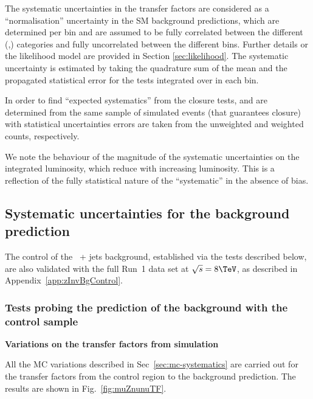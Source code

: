 The systematic uncertainties in the transfer factors are considered as
a ``normalisation'' uncertainty in the SM background predictions,
which are determined per \scalht bin and are
assumed to be fully correlated between the different (\njet,\nb)
categories and fully uncorrelated between the different \scalht bins. 
Further details or the likelihood model
are provided in Section \ref{sec:likelihood}. The systematic
uncertainty is estimated by taking the quadrature sum of the 
mean and the propagated statistical error for the tests integrated
over \njet in each \scalht bin.

In order to find ``expected systematics'' from the closure tests, \nobs and \npre are
determined from the same sample of simulated events (that guarantees
closure) with statistical uncertainties errors are taken from the
unweighted and weighted counts, respectively. 

We note the behaviour of the magnitude of the systematic uncertainties
on the integrated luminosity, which reduce with increasing
luminosity. This is a reflection of the fully statistical nature of
the ``systematic'' in the absence of bias.

\subsection{Systematic uncertainties for the \znunu background
prediction}

The control of the \znunu\ + jets background, established via the
tests described below, are also validated with the full Run~1 data set
at $\sqrt{s} = 8\tev$, as described in
Appendix~\ref{app:zInvBgControl}.

\subsubsection{Tests probing the prediction of the \znunu
background with the \mj control sample}
\label{sec:muZnunu}

{\bf Variations on the transfer factors from simulation}

All the MC variations described in Sec~\ref{sec:mc-systematics} are
carried out for the transfer factors from the \mj control region to
the \znunu background prediction. The results are shown in
Fig.~\ref{fig:muZnunuTF}.

